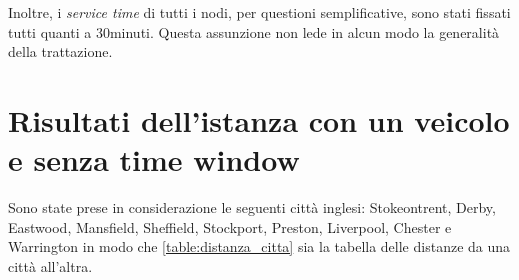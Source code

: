 		Inoltre, i \emph{service time} di tutti i nodi, per questioni semplificative, sono stati fissati tutti quanti a 30minuti. Questa assunzione non lede in alcun modo la generalità della trattazione.

	\section{Risultati dell’istanza con un veicolo e senza time window}
	\label{sec:istanza_singolo_veicolo_no_time_window}
		Sono state prese in considerazione le seguenti città inglesi: Stokeontrent,	Derby, Eastwood, Mansfield,	Sheffield, Stockport, Preston, Liverpool, Chester e Warrington in modo che \ref{table:distanza_citta} sia la tabella delle distanze da una città all’altra.

		\begin{table}
			\centering
			\small
			\caption{Distanza tra le città (m)}
			\label{table:distanza_citta}
\end{table}
